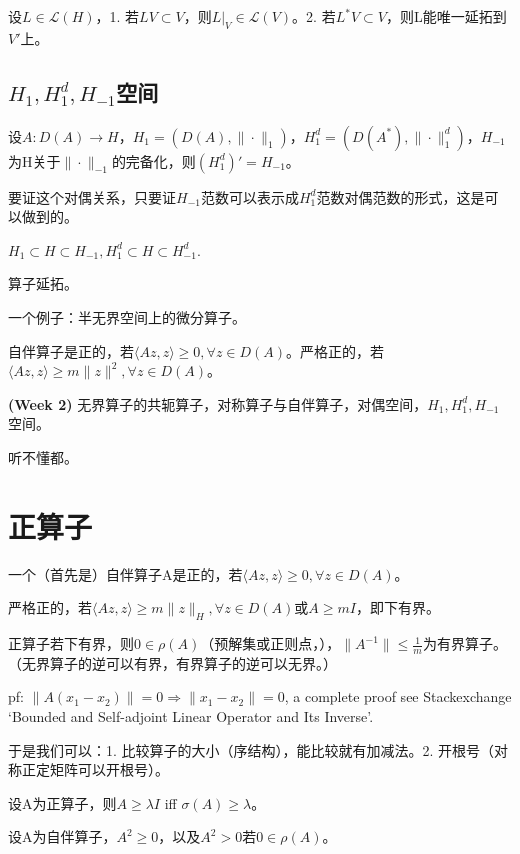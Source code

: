 设$L \in \mathcal{L}(H)$，1. 若$LV \subset V$，则$L|_V \in \mathcal{L}(V)$。2. 若$L^{\ast}V \subset V$，则L能唯一延拓到$V'$上。

\subsection{\texorpdfstring{$H_1, H_1^d, H_{-1}$}{TEXT}空间}

设$A: D(A) \to H$，$H_1 = (D(A), \|\cdot\|_1)$，$H_1^d = (D(A^{\ast}), \|\cdot\|_1^d)$，$H_{-1}$为H关于$\|\cdot\|_{-1}$的完备化，则$(H_1^d)' = H_{-1}$。

要证这个对偶关系，只要证$H_{-1}$范数可以表示成$H_1^d$范数对偶范数的形式，这是可以做到的。

$H_1 \subset H \subset H_{-1}, H_1^d \subset H \subset H_{-1}^d$.

算子延拓。

一个例子：半无界空间上的微分算子。

自伴算子是正的，若$\langle Az, z \rangle \ge 0, \forall z \in D(A)$。严格正的，若$\langle Az, z \rangle \ge m\|z\|^2, \forall z \in D(A)$。

\begin{conc}
  \textbf{(Week 2)} 无界算子的共轭算子，对称算子与自伴算子，对偶空间，$H_1, H_1^d, H_{-1}$空间。

  听不懂都。
\end{conc}

\section{正算子}

一个（首先是）自伴算子A是正的，若$\langle Az, z \rangle \ge 0, \forall z \in D(A)$。

严格正的，若$\langle Az, z \rangle \ge m\|z\|_H, \forall z \in D(A)$或$A \ge mI$，即下有界。

正算子若下有界，则$0 \in \rho(A)$（预解集或正则点，），$\|A^{-1}\| \le \frac{1}{m}$为有界算子。（无界算子的逆可以有界，有界算子的逆可以无界。）

pf: $\|A(x_1 - x_2)\| = 0 \Rightarrow \|x_1 - x_2\| = 0$, a complete proof see Stackexchange `Bounded and Self-adjoint Linear Operator and Its Inverse'.

于是我们可以：1. 比较算子的大小（序结构），能比较就有加减法。2. 开根号（对称正定矩阵可以开根号）。

设A为正算子，则$A \ge \lambda I$ iff $\sigma(A) \ge \lambda$。

设A为自伴算子，$A^2 \ge 0$，以及$A^2 > 0$若$0 \in \rho(A)$。

